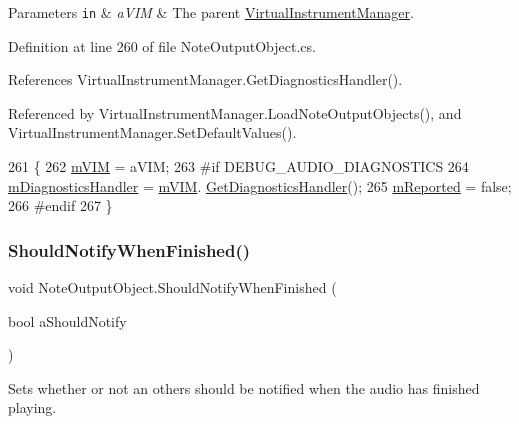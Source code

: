 \begin{DoxyParams}[1]{Parameters}
\mbox{\tt in}  & {\em a\+V\+IM} & The parent \hyperlink{class_virtual_instrument_manager}{Virtual\+Instrument\+Manager}. \\
\hline
\end{DoxyParams}


Definition at line 260 of file Note\+Output\+Object.\+cs.



References Virtual\+Instrument\+Manager.\+Get\+Diagnostics\+Handler().



Referenced by Virtual\+Instrument\+Manager.\+Load\+Note\+Output\+Objects(), and Virtual\+Instrument\+Manager.\+Set\+Default\+Values().


\begin{DoxyCode}
261     \{
262         \hyperlink{group___n_o_o_priv_var_ga61394090fddcb90c67bf68f19a5bfb6e}{mVIM} = aVIM;
263 \textcolor{preprocessor}{        #if DEBUG\_AUDIO\_DIAGNOSTICS}
264             \hyperlink{group___n_o_o_priv_var_gacd4376d2314caafc831cc049e9ca58d8}{mDiagnosticsHandler} = \hyperlink{group___n_o_o_priv_var_ga61394090fddcb90c67bf68f19a5bfb6e}{mVIM}.
      \hyperlink{group___v_i_m_pub_func_ga7e60bc3c5464d8f34f0d56def675bcc6}{GetDiagnosticsHandler}();
265             \hyperlink{group___n_o_o_priv_var_gafa20525b5515ab62d109f44ab45fba21}{mReported} = \textcolor{keyword}{false};
266 \textcolor{preprocessor}{        #endif}
267     \}
\end{DoxyCode}
\mbox{\label{group___n_o_o_pub_func_gab7bad1b7d462676843be9e0bbfa1c9fb}} 
\subsubsection{\texorpdfstring{Should\+Notify\+When\+Finished()}{ShouldNotifyWhenFinished()}}
{\footnotesize\ttfamily void Note\+Output\+Object.\+Should\+Notify\+When\+Finished (\begin{DoxyParamCaption}\item[{bool}]{a\+Should\+Notify }\end{DoxyParamCaption})}



Sets whether or not an others should be notified when the audio has finished playing. 


